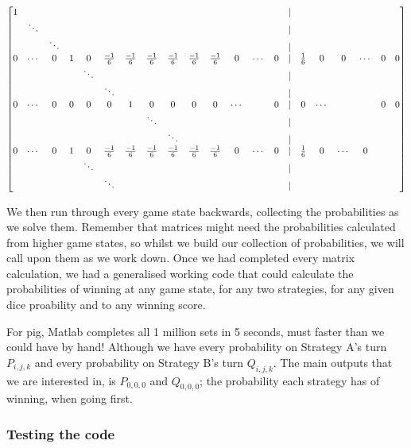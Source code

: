 \documentclass[a4paper,titlepage]{article}
\begin{document}
\begin{align*}
	\setcounter{MaxMatrixCols}{40}
	\begin{bmatrix}
		1       &&&&&&&&&&&&&&|&&&&&&\\
		& \ddots &&&&&&&&&&&&&|&&&&&&\\
		&& \ddots &&&&&&&&&&&&|&&&&&&\\
		0 & \cdots & 0 & 1 & 0 & \frac{-1}{6} & \frac{-1}{6} & \frac{-1}{6} & \frac{-1}{6} & \frac{-1}{6} & \frac{-1}{6}  & 0 & \cdots & 0 & | & \frac{1}{6} & 0 & 0 & \cdots & 0 & 0\\
		&&&& \ddots &&&&&&&&&&|&&&&\\
		&&&&& \ddots &&&&&&&&&|&&&& \\
		0 & \cdots & 0 & 0 & 0 & 0 & 1 & 0 & 0 & 0 & 0 &\cdots&&0&|&0&\cdots&&&0&0\\
		&&&&&&&\ddots&&&&&&&|&&&&&&\\
		&&&&&&&&\ddots&&&&&&|&&&&&&\\
		0 & \cdots & 0 & 1 & 0 & \frac{-1}{6} & \frac{-1}{6} & \frac{-1}{6} & \frac{-1}{6} & \frac{-1}{6} & \frac{-1}{6}  & 0 & \cdots & 0 & | & \frac{1}{6} & 0 & \cdots & 0\\
		&   &   &   & \ddots &&&&&&&&&&|&&&&\\
		&   &   &   &   & \ddots &&&&&&&&&|&&&& \\
	\end{bmatrix}
\end{align*}

We then run through every game state backwards, collecting the probabilities as we solve them. Remember that matrices might need the probabilities calculated from higher game states, so whilst we build our collection of probabilities, we will call upon them as we work down. Once we had completed every matrix calculation, we had a generalised working code that could calculate the probabilities of winning at any game state, for any two strategies, for any given dice proability and to any winning score.

For pig, Matlab completes all 1 million sets in 5 seconds, must faster than we could have by hand! Although we have every probability on Strategy A's turn $P_{i,j,k}$ and every probability on Strategy B's turn $Q_{i,j,k}$. The main outputs that we are interested in, is $P_{0,0,0}$ and $Q_{0,0,0}$; the probability each strategy has of winning, when going first.

\subsubsection{Testing the code}
\end{document}
